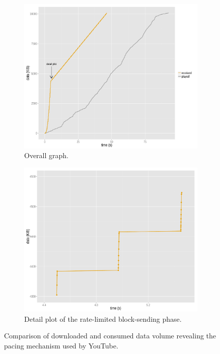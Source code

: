 \begin{figure}[htbp]
    \centering
        \begin{subfigure}[b]{0.72\textwidth}
                \centering
                \includegraphics[width=\textwidth]{images/R-blocktransfer.pdf}
                \caption{Overall graph.}
                \label{c3:fig:blocktransfer-overall}
        \end{subfigure}

        \begin{subfigure}[b]{0.72\textwidth}
                \centering
                \includegraphics[width=\textwidth]{images/R-blocktransferdetail.pdf}
                \caption{Detail plot of the rate-limited block-sending phase.}
                \label{c3:fig:blocktransfer-detail}
        \end{subfigure}
\caption{Comparison of downloaded and consumed data volume revealing the pacing mechanism used by YouTube.}
\label{c3:fig:blocktransfer}
\end{figure}


